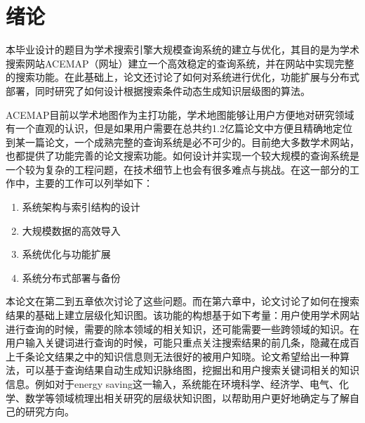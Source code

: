 
\chapter{绪论}
\label{chap:c1}

本毕业设计的题目为学术搜索引擎大规模查询系统的建立与优化，其目的是为学术搜索网站ACEMAP（网址）建立一个高效稳定的查询系统，并在网站中实现完整的搜索功能。在此基础上，论文还讨论了如何对系统进行优化，功能扩展与分布式部署，同时研究了如何设计根据搜索条件动态生成知识层级图的算法。

ACEMAP目前以学术地图作为主打功能，学术地图能够让用户方便地对研究领域有一个直观的认识，但是如果用户需要在总共约1.2亿篇论文中方便且精确地定位到某一篇论文，一个成熟完整的查询系统是必不可少的。目前绝大多数学术网站，也都提供了功能完善的论文搜索功能。如何设计并实现一个较大规模的查询系统是一个较为复杂的工程问题，在技术细节上也会有很多难点与挑战。在这一部分的工作中，主要的工作可以列举如下：

\begin{enumerate}
  \item 系统架构与索引结构的设计
  \item 大规模数据的高效导入
  \item 系统优化与功能扩展
  \item 系统分布式部署与备份
\end{enumerate}

本论文在第二到五章依次讨论了这些问题。而在第六章中，论文讨论了如何在搜索结果的基础上建立层级化知识图。该功能的构想基于如下考量：用户使用学术网站进行查询的时候，需要的除本领域的相关知识，还可能需要一些跨领域的知识。在用户输入关键词进行查询的时候，可能只重点关注搜索结果的前几条，隐藏在成百上千条论文结果之中的知识信息则无法很好的被用户知晓。论文希望给出一种算法，可以基于查询结果自动生成知识脉络图，挖掘出和用户搜索关键词相关的知识信息。例如对于energy saving这一输入，系统能在环境科学、经济学、电气、化学、数学等领域梳理出相关研究的层级状知识图，以帮助用户更好地确定与了解自己的研究方向。